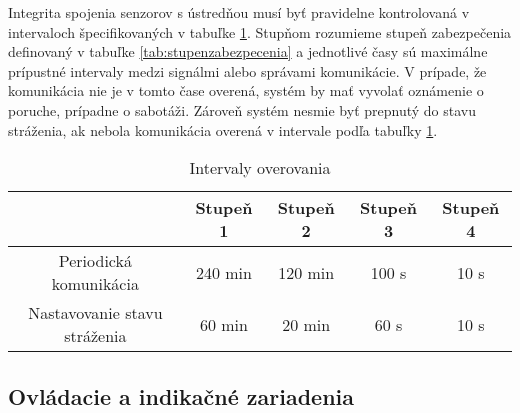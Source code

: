 Integrita spojenia senzorov s ústredňou musí byť pravidelne kontrolovaná v intervaloch špecifikovaných v tabuľke \ref{tab:interval_overenia}. Stupňom rozumieme stupeň zabezpečenia definovaný v tabuľke \ref{tab:stupenzabezpecenia} a jednotlivé časy sú maximálne prípustné intervaly medzi signálmi alebo správami komunikácie. V prípade, že komunikácia nie je v tomto čase overená, systém by mať vyvolať oznámenie o poruche, prípadne o sabotáži. Zároveň systém nesmie byť prepnutý do stavu stráženia, ak nebola komunikácia overená v intervale podľa tabuľky \ref{tab:interval_overenia}.

\begin{table}[ht]
    \centering
    \renewcommand{\arraystretch}{1.5}
    \begin{tabular}{|c|c|c|c|c|}
        \hline
         & Stupeň 1 & Stupeň 2 & Stupeň 3 & Stupeň 4 \\ \hline
        Periodická komunikácia & 240 min & 120 min & 100 s & 10 s \\ \hline
        Nastavovanie stavu stráženia & 60 min & 20 min & 60 s & 10 s\\ \hline
    \end{tabular}
    \caption{Intervaly overovania\cite{csn-en-50131-1}}
    \label{tab:interval_overenia}
\end{table}



\subsection{Ovládacie a indikačné zariadenia}

